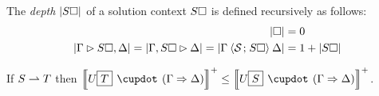 \begin{definition}
The \emph{depth} $\left|S\square\right|$ of a solution context $S\square$ is defined
recursively as follows:
\begin{align*}
  \left|\square\right| &= 0 \\
  \left|\Gamma \mathbin{\rhd} S\square, \Delta\right| = \left|\Gamma, S\square \mathbin{\rhd} \Delta\right| =
  \left|\Gamma \mathbin{\langle \mathcal{S} \;\!;\!\; S\square \rangle} \Delta\right| &= 1 + \left|S\square\right|
\end{align*}
\end{definition}

\begin{lemma}

  If $S \rightharpoonup T$ then $\psint{U\select{T} \mix (\Gamma \seq \Delta)} \sement
  \psint{U\select{S} \mix (\Gamma \seq \Delta)}$.
\end{lemma}
